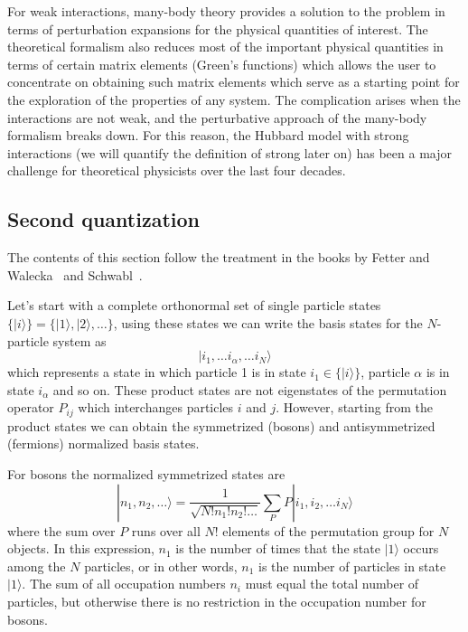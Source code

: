 \documentclass[11pt,letter]{article}
\begin{document}
For weak interactions, many-body theory provides a solution to the problem in
terms of perturbation expansions for the physical quantities of interest.   The
theoretical formalism also reduces most of the important physical quantities in
terms of certain matrix elements (Green's functions) which allows the user to
concentrate on obtaining such matrix elements which serve as a starting point
for the exploration of the properties of any system.   The complication arises
when the interactions are not weak, and the perturbative approach of the
many-body formalism breaks down.   For this reason, the Hubbard model with strong
interactions (we will quantify the definition of strong later on) has been a
major challenge for theoretical physicists over the last four decades. 
 


\subsection{Second quantization}

The contents of this section follow the treatment in the books by Fetter and Walecka~\cite{fetter2003quantum} and Schwabl~\cite{schwabl2005advanced}.  

Let's start with a complete orthonormal set of single particle states $\lbrace
|i\rangle \rbrace = \lbrace |1\rangle, |2\rangle, \ldots \rbrace$, using these
states we can write the basis states for the $N$-particle system as
\begin{equation}
   | i_{1}, \ldots i_{\alpha}, \ldots i_{N} \rangle  
\end{equation} 
which represents a state in which particle 1 is in state $i_{1} \in \lbrace |i\rangle \rbrace$, particle
$\alpha$ is in state $i_{\alpha}$ and so on.   These product states are not eigenstates
of the permutation operator $P_{ij}$ which interchanges particles $i$ and $j$.
However, starting from the product states we can obtain the symmetrized (bosons) and antisymmetrized (fermions) normalized basis states.   

For bosons the normalized symmetrized states are
\begin{equation} 
  | n_{1},  n_{2}, \ldots \rangle = 
  \frac{1}{\sqrt{N!n_{1}!n_{2}!\ldots}} \sum_{P}  P | i_{1},  i_{2}, \ldots i_{N} \rangle
\end{equation} 
where the sum over $P$ runs over all $N!$ elements of the permutation group for
$N$ objects.  In this expression, $n_{1}$ is the number of times that the state
$|1\rangle$ occurs among the $N$ particles,  or in other words, $n_{1}$ is the number of
particles in state $|1\rangle$.  The sum of all occupation numbers $n_{i}$ must equal the total number of particles, but otherwise there is no restriction in the occupation number for bosons.
\end{document}
